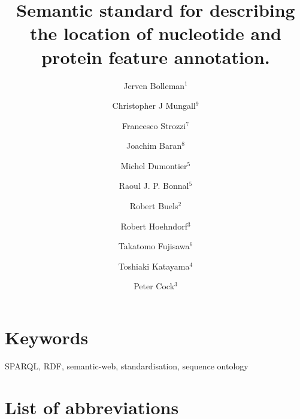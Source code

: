 \documentclass[10pt]{bmc_article}
\newenvironment{bmcformat}{\begin{raggedright}\baselineskip20pt\sloppy\setboolean{publ}{false}}{\end{raggedright}\baselineskip20pt\sloppy}
\begin{document}
\begin{bmcformat}
\title{Semantic standard for describing the location of nucleotide and protein feature annotation.}
\author{Jerven Bolleman\correspondingauthor$^1$%
    \and Christopher J Mungall$^9$%
    \and Francesco Strozzi$^7$%
    \and Joachim Baran$^8$%
    \and Michel Dumontier$^5$%
    \and Raoul J. P. Bonnal$^5$%
    \and Robert Buels$^2$%
    \and Robert Hoehndorf$^3$%
    \and Takatomo Fujisawa$^6$%
    \and Toshiaki Katayama$^4$%
    \and Peter Cock$^3$%
%
}
\address{
 \iid(1) SIB Swiss Institute of Bioinformatics, Centre Medical Universitaire, 1 rue Michel
Servet, 1211 Geneva 4, Switzerland,
 \iid(2) University of California, Berkeley, Berkeley, CA, USA,
 \iid(3) The James Hutton Institute, Dundee, DD2 5DA, UK,
 \iid(4) Database Center for Life Science, Research Organization of Information and Systems, 2-11-16, Yayoi, Bunkyo-ku, Tokyo, 113-0032, Japan,
 \iid(5) Integrative Biology Program, Istituto Nazionale Genetica Molecolare, Milan, Italy,
 \iid(6) Center for Information Biology, National Institute of Genetics, Research Organization of Information and Systems, 1111 Yata, Mishima, Shizuoka 411-08540, Japan,
 \iid(7) CeRSA, Parco Tecnologico Padano, Lodi 26900, Italy, and
 \iid(8) Ontario Institute for Cancer Research, 101 College Street, Suite 800, Toronto, Ontario, M5G 0A3, Canada.
 \iid(9) Genomics Division, Lawrence Berkeley National Laboratory, Berkeley, CA, 94720, US
 \iid(10) Stanford Center for Biomedical Informatics Research, 1265 Welch Road, Room X223, Stanford, CA, 94305-5479, US
}
\maketitle


\section*{Keywords}
SPARQL, RDF, semantic-web, standardisation, sequence ontology









\section*{List of abbreviations}


\end{bmcformat}
\end{document}
